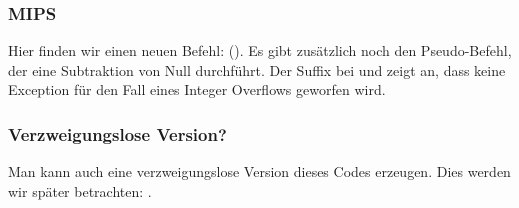 \subsubsection{MIPS}



Hier finden wir einen neuen Befehl:  ().
Es gibt zusätzlich noch den  Pseudo-Befehl, der eine Subtraktion von Null durchführt. Der Suffix  bei
 und  zeigt an, dass keine Exception für den Fall eines Integer Overflows geworfen wird.


\subsubsection{Verzweigungslose Version?}
Man kann auch eine verzweigungslose Version dieses Codes erzeugen. Dies werden wir später betrachten:
. 

